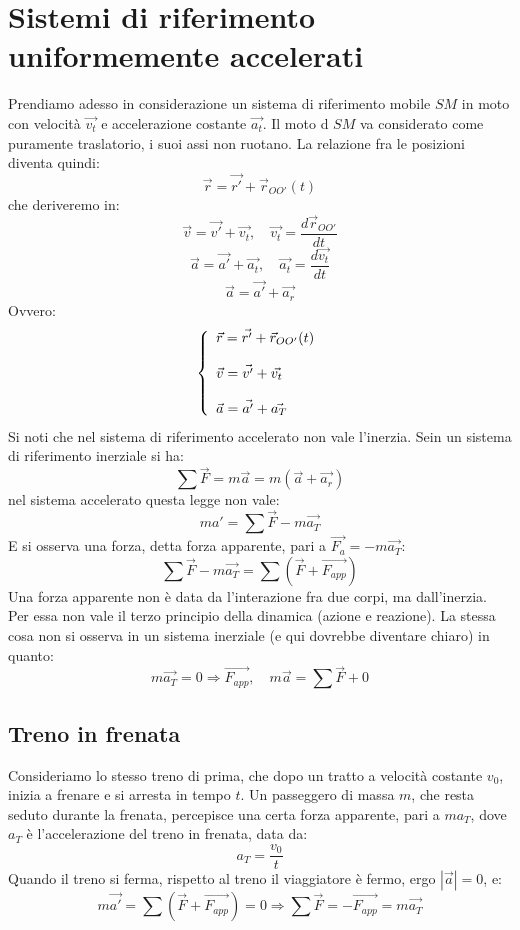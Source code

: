 \documentclass[a4paper,12pt]{article}
\begin{document}
\section{Sistemi di riferimento uniformemente accelerati}
Prendiamo adesso in considerazione un sistema di riferimento mobile $SM$ in moto con velocità $\vec{v_t}$ e accelerazione
costante $\vec{a_t}$. Il moto d $SM$ va considerato come puramente traslatorio, i suoi assi non ruotano. La relazione
fra le posizioni diventa quindi:
$$ \vec{r} = \vec{r'} + \vec{r}_{OO'}(t) $$
che deriveremo in:
$$ \vec{v} = \vec{v'} + \vec{v_t}, \quad \vec{v_t} = \frac{d\vec{r}_{OO'}}{dt} $$
$$ \vec{a} = \vec{a'} + \vec{a_t}, \quad \vec{a_t} = \frac{d\vec{v_t}}{dt} $$
$$ \vec{a} = \vec{a'} + \vec{a_r} $$
Ovvero:
$$ 
\left\{\begin{array}{l}
    \vec{r} = \vec{r'} + \vec{r}_{OO'}(t) \cr \\
  \vec{v} = \vec{v'} + \vec{v_t} \cr \\
  \vec{a} = \vec{a'} + \vec{a_T}
\end{array}\right.
$$
Si noti che nel sistema di riferimento accelerato non vale l'inerzia. Sein un sistema di riferimento
inerziale si ha:
$$ \sum \vec{F}  = m\vec{a} = m(\vec{a} + \vec{a_r})$$
nel sistema accelerato questa legge non vale:
$$ ma' = \sum \vec{F} - m \vec{a_T} $$
E si osserva una forza, detta forza apparente, pari a $\vec{F_a} = -m\vec{a_T}$:
$$ \sum \vec{F} -m\vec{a_T} = \sum(\vec{F}+\vec{F_{app}})$$
Una forza apparente non è data da l'interazione fra due corpi, ma dall'inerzia. Per essa non vale il
terzo principio della dinamica (azione e reazione). La stessa cosa non si osserva in un sistema inerziale
(e qui dovrebbe diventare chiaro) in quanto:
$$ m\vec{a_T} = 0 \Rightarrow \vec{F_{app}}, \quad m\vec{a} = \sum \vec{F} + 0$$
\subsection{Treno in frenata}
Consideriamo lo stesso treno di prima, che dopo un tratto a velocità costante $v_0$, inizia a frenare e si arresta
in tempo $t$. Un passeggero di massa $m$, che resta seduto durante la frenata, percepisce una certa forza
apparente, pari a $ma_T$, dove $a_T$ è l'accelerazione del treno in frenata, data da:
$$ a_T = \frac{v_0}{t} $$
Quando il treno si ferma, rispetto al treno il viaggiatore è fermo, ergo $|\vec{a}| = 0$, e:
$$ m\vec{a'} = \sum (\vec{F} + \vec{F_{app}}) = 0 \Rightarrow \sum \vec{F} = -\vec{F_{app}} = m\vec{a_T} $$
\end{document}
